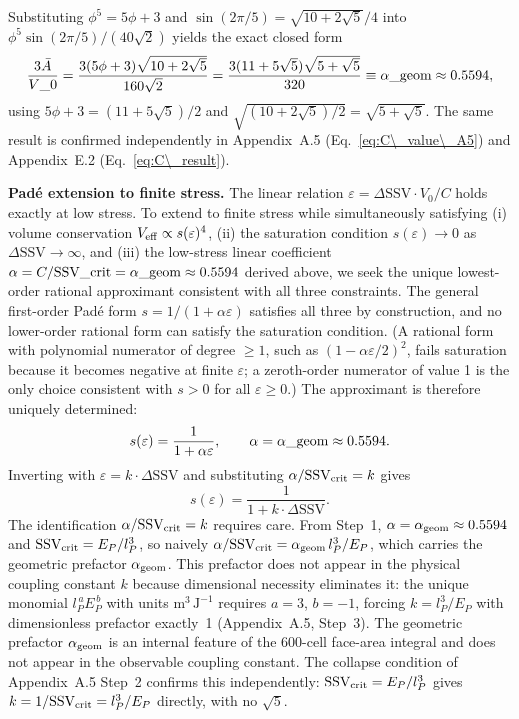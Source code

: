 \documentclass[11pt,letterpaper]{article}
\begin{document}
Substituting $\phi^5 = 5\phi+3$ and $\sin(2\pi/5) = \sqrt{10+2\sqrt{5}}/4$
into $\phi^5\sin(2\pi/5)/(40\sqrt{2})$ yields the exact closed form
\[
\frac{3\bar{A}}{V\_0}
= \frac{3(5\phi+3)\sqrt{10+2\sqrt{5}}}{160\sqrt{2}}
= \frac{3(11+5\sqrt{5})\sqrt{5+\sqrt{5}}}{320}
\equiv \alpha\_{\rm geom} \approx 0.5594,
\]
using $5\phi+3 = (11+5\sqrt{5})/2$ and
$\sqrt{(10+2\sqrt{5})/2} = \sqrt{5+\sqrt{5}}$.
The same result is confirmed independently in Appendix~A.5
(Eq.~\ref{eq:C\_value\_A5}) and Appendix~E.2 (Eq.~\ref{eq:C\_result}).

\textbf{Padé extension to finite stress.}
The linear relation $\varepsilon = \Delta\text{SSV} \cdot V_0 / C$ holds 
exactly at low stress. To extend to finite stress while simultaneously 
satisfying (i) volume conservation $V_{\rm eff} \propto s(\varepsilon)^4$, 
(ii) the saturation condition $s(\varepsilon) \to 0$ as 
$\Delta\text{SSV} \to \infty$, and (iii) the low-stress linear coefficient 
$\alpha = C/\text{SSV}\_{\rm crit} = \alpha\_{\rm geom} \approx 0.5594$ derived above, we seek the 
unique lowest-order rational approximant consistent with all three constraints. 
The general first-order Padé form $s = 1/(1 + \alpha\varepsilon)$ satisfies 
all three by construction, and no lower-order rational form can satisfy the saturation condition. (A rational form with polynomial numerator of degree $\geq 1$, such as $(1-\alpha\varepsilon/2)^2$, fails saturation because it becomes negative at finite $\varepsilon$; a zeroth-order numerator of value 1 is the only choice consistent with $s > 0$ for all $\varepsilon \geq 0$.) The approximant is therefore uniquely determined:
\[
s(\varepsilon) = \frac{1}{1 + \alpha\varepsilon}, \qquad
\alpha = \alpha\_{\rm geom} \approx 0.5594.
\]
Inverting with $\varepsilon = k\cdot\Delta\text{SSV}$ and substituting 
$\alpha/\text{SSV}_{\rm crit} = k$ gives
\[
s(\varepsilon) = \frac{1}{1 + k\cdot\Delta\text{SSV}}.
\]
The identification $\alpha/\text{SSV}_{\rm crit} = k$ requires care.
From Step~1, $\alpha = \alpha_{\rm geom} \approx 0.5594$ and
$\text{SSV}_{\rm crit} = E_P/l_P^3$, so naively
$\alpha/\text{SSV}_{\rm crit} = \alpha_{\rm geom}\,l_P^3/E_P$, which
carries the geometric prefactor $\alpha_{\rm geom}$. This prefactor
does not appear in the physical coupling constant $k$ because
dimensional necessity eliminates it: the unique monomial
$l_P^{\,a}E_P^{\,b}$ with units $\text{m}^3\,\text{J}^{-1}$
requires $a = 3$, $b = -1$, forcing $k = l_P^3/E_P$ with dimensionless
prefactor exactly~1 (Appendix~A.5, Step~3). The geometric prefactor
$\alpha_{\rm geom}$ is an internal feature of the 600-cell face-area
integral and does not appear in the observable coupling constant. The collapse condition of Appendix~A.5 Step~2 confirms this 
independently: $\text{SSV}_{\rm crit} = E_P/l_P^3$ gives 
$k = 1/\text{SSV}_{\rm crit} = l_P^3/E_P$ directly, with no $\sqrt{5}$.
\end{document}
